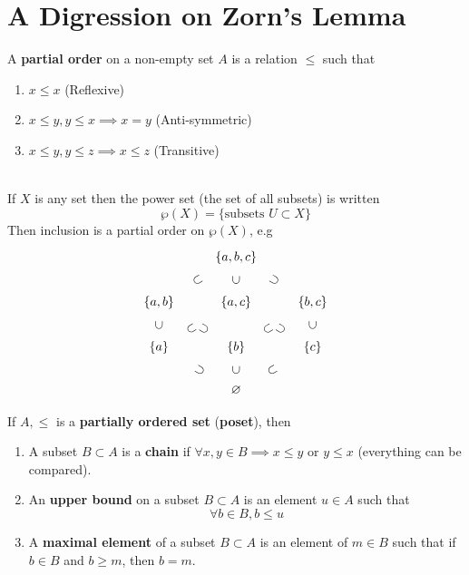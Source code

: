 \documentclass[../Main.tex]{subfiles}
\begin{document}
\section*{A Digression on Zorn's Lemma}
\begin{dfn}[title = Partial Order]
	A \textbf{partial order} on a non-empty set $A$ is a relation $\le$ such that
	\begin{enumerate}
		\item $x\le x$ (Reflexive)
		\item $x\le y, y\le x \implies x =y$ (Anti-symmetric)
		\item $x\le y, y\le z\implies x\le z$ (Transitive)
	\end{enumerate}
\end{dfn}
\begin{example}~\\
	If $X$ is any set then the power set (the set of all subsets) is written
	\[\wp(X) = \{\text{subsets } U \subset X\}\]
	Then inclusion is a partial order on $\wp(X)$, e.g \[
	\begin{tikzcd}
	& \{a,b,c\} \\
	\{a,b\}\arrow[ur, phantom, "\subset"{sloped}] & \{a,c\}\arrow[u, phantom, "\subset"{sloped}] & \{b,c\}\arrow[ul, phantom, "\supset"{sloped}] \\
	\{a\}\arrow[u, phantom, "\subset"{sloped}]\arrow[ur, phantom, "\subset"{sloped}, pos=.4] & \{b\}\arrow[ul, phantom, "\supset"{sloped}, pos=.4]\arrow[ur, phantom, "\subset"{sloped}, pos=.4] & \{c\}\arrow[ul, phantom, "\supset"{sloped}, pos=.4]\arrow[u, phantom, "\subset"{sloped}] \\
	& \varnothing\arrow[ul, phantom, "\supset"{sloped}]\arrow[u, phantom, "\subset"{sloped}]\arrow[ur, phantom, "\subset"{sloped}]
	\end{tikzcd}
	\]
\end{example}
\begin{dfn}[title = {Poset, Chain, Upper Bound, Maximal Element}]
	If $A,\le$ is a \textbf{partially ordered set} (\textbf{poset}), then
	\begin{enumerate}
		\item A subset $B\subset A$ is a \textbf{chain} if $\forall x,y \in B \implies x\le y$ or $y\le x$ (everything can be compared).
		\item An \textbf{upper bound} on a subset $B\subset A$ is an element $u\in A$ such that \[\forall b\in B, b\le u\]
		\item A \textbf{maximal element} of a subset $B\subset A$ is an element of $m\in B$ such that if $b\in B$ and $b\ge m$, then $b=m$.
	\end{enumerate}
\end{dfn}
\end{document}

